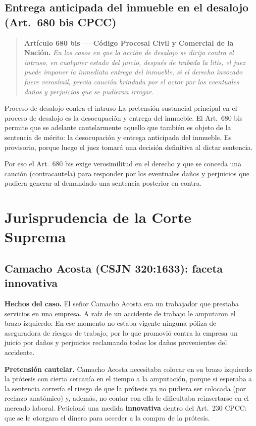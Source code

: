 \documentclass[12pt,oneside]{book}
\begin{document}
\subsection{Entrega anticipada del inmueble en el desalojo (Art.~680 bis CPCC)}

\begin{quote}
\small
\textbf{Artículo 680 bis --- Código Procesal Civil y Comercial de la Nación.} \textit{En los casos en que la acción de desalojo se dirija contra el intruso, en cualquier estado del juicio, después de trabada la litis, el juez puede imponer la inmediata entrega del inmueble, si el derecho invocado fuere verosímil, previa caución brindada por el actor por los eventuales daños y perjuicios que se pudieran irrogar.}
\end{quote}

\begin{example}{Proceso de desalojo contra el intruso}
La pretensión sustancial principal en el proceso de desalojo es la desocupación y entrega del inmueble. El Art.~680 bis permite que se adelante cautelarmente aquello que también es objeto de la sentencia de mérito: la desocupación y entrega anticipada del inmueble. Es provisorio, porque luego el juez tomará una decisión definitiva al dictar sentencia.

Por eso el Art.~680 bis exige verosimilitud en el derecho y que se conceda una caución (contracautela) para responder por los eventuales daños y perjuicios que pudiera generar al demandado una sentencia posterior en contra.
\end{example}

\section{Jurisprudencia de la Corte Suprema}

\subsection{Camacho Acosta (CSJN 320:1633): faceta innovativa}

\textbf{Hechos del caso.} El señor Camacho Acosta era un trabajador que prestaba servicios en una empresa. A raíz de un accidente de trabajo le amputaron el brazo izquierdo. En ese momento no estaba vigente ninguna póliza de aseguradora de riesgos de trabajo, por lo que promovió contra la empresa un juicio por daños y perjuicios reclamando todos los daños provenientes del accidente.

\textbf{Pretensión cautelar.} Camacho Acosta necesitaba colocar en su brazo izquierdo la prótesis con cierta cercanía en el tiempo a la amputación, porque si esperaba a la sentencia correría el riesgo de que la prótesis ya no pudiera ser colocada (por rechazo anatómico) y, además, no contar con ella le dificultaba reinsertarse en el mercado laboral. Peticionó una medida \textbf{innovativa} dentro del Art.~230 CPCC: que se le otorgara el dinero para acceder a la compra de la prótesis.
\end{document}
